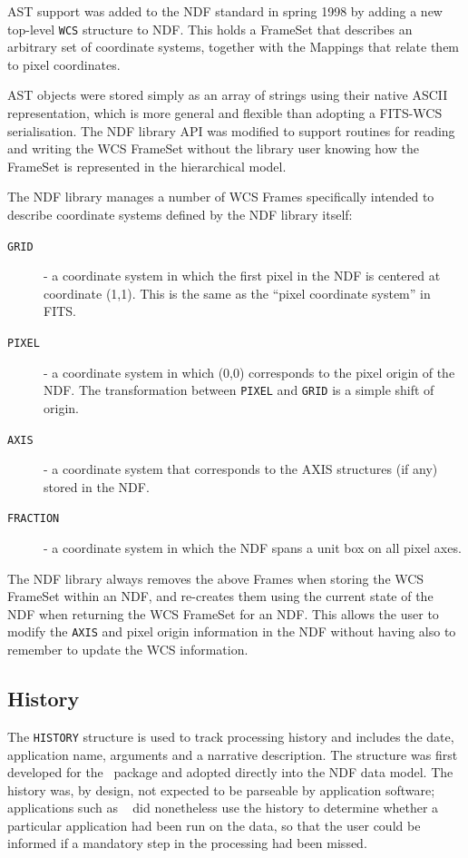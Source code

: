 \documentclass[final,authoryear,5p,times,twocolumn]{elsarticle}
\begin{document}
AST support was added to the NDF standard in spring 1998
\citep{2001ASPC..238..129B} by adding a new top-level \texttt{WCS} structure
to NDF. This holds a FrameSet that describes an arbitrary set of coordinate
systems, together with the Mappings that relate them to pixel coordinates.

AST objects were stored simply as an array of strings using their native
ASCII representation, which is more general and flexible
than adopting a FITS-WCS serialisation. The NDF library API was modified
to support routines for reading and writing the WCS FrameSet without the
library user knowing how the FrameSet is represented in the hierarchical
model.

The NDF library manages a number of WCS Frames specifically intended to
describe coordinate systems defined by the NDF library itself:

\begin{description}
\item[\texttt{GRID}] - a coordinate system in which the first pixel in the NDF
is centered at coordinate (1,1). This is the same as the ``pixel coordinate
system'' in FITS.
\item[\texttt{PIXEL}] - a coordinate system in which (0,0) corresponds to
the pixel origin of the NDF. The transformation between \texttt{PIXEL}
and \texttt{GRID} is a simple shift of origin.
\item[\texttt{AXIS}] - a coordinate system that corresponds to the AXIS
structures (if any) stored in the NDF.
\item[\texttt{FRACTION}] - a coordinate system in which the NDF spans a
unit box on all pixel axes.
\end{description}

The NDF library always removes the above Frames when storing the
WCS FrameSet within an NDF, and re-creates them using the current state
of the NDF when returning the WCS FrameSet for an NDF. This allows the
user to modify the \texttt{AXIS} and pixel origin information in the
NDF without having also to remember to update the WCS information.

\subsection{History}

The \texttt{HISTORY} structure is used to track processing history and
includes the date, application name, arguments and a narrative
description. The structure was first developed for the
\asterix\ package and adopted directly into the NDF data
model. The history was, by design, not expected to be parseable by
application software; applications such as \surf\
\citep[][]{1998ASPC..145..216J} did nonetheless use the history to determine whether a
particular application had been run on the data, so that the user could be
informed if a mandatory step in the processing had been missed.
\end{document}
